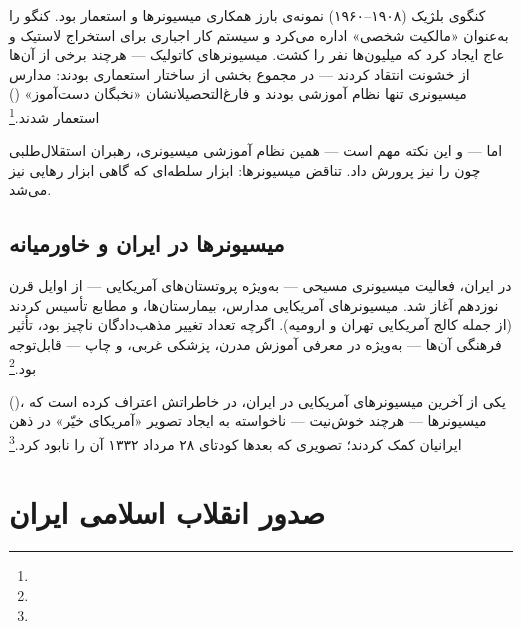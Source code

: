 \begin{tcolorbox}[casebox, title={مطالعه‌ی موردی: کنگوی بلژیک — میسیونرها و استعمار}]
کنگوی بلژیک (۱۹۰۸–۱۹۶۰) نمونه‌ی بارز همکاری میسیونرها و استعمار بود.  کنگو را به‌عنوان «مالکیت شخصی» اداره می‌کرد و سیستم کار اجباری برای استخراج لاستیک و عاج ایجاد کرد که میلیون‌ها نفر را کشت. میسیونرهای کاتولیک — هرچند برخی از آن‌ها از خشونت انتقاد کردند — در مجموع بخشی از ساختار استعماری بودند: مدارس میسیونری تنها نظام آموزشی بودند و فارغ‌التحصیلانشان «نخبگان دست‌آموز» () استعمار شدند.\footnote{}

اما — و این نکته مهم است — همین نظام آموزشی میسیونری، رهبران استقلال‌طلبی چون  را نیز پرورش داد. تناقض میسیونرها: ابزار سلطه‌ای که گاهی ابزار رهایی نیز می‌شد.
\end{tcolorbox}

\subsection{میسیونرها در ایران و خاورمیانه}
\label{subsec:ch13-iran-missionaries}

در ایران، فعالیت میسیونری مسیحی — به‌ویژه پروتستان‌های آمریکایی — از اوایل قرن نوزدهم آغاز شد. میسیونرهای آمریکایی مدارس، بیمارستان‌ها، و مطابع تأسیس کردند (از جمله کالج آمریکایی تهران و ارومیه). اگرچه تعداد تغییر مذهب‌دادگان ناچیز بود، تأثیر فرهنگی آن‌ها — به‌ویژه در معرفی آموزش مدرن، پزشکی غربی، و چاپ — قابل‌توجه بود.\footnote{}

 ()، یکی از آخرین میسیونرهای آمریکایی در ایران، در خاطراتش اعتراف کرده است که میسیونرها — هرچند خوش‌نیت — ناخواسته به ایجاد تصویر «آمریکای خیّر» در ذهن ایرانیان کمک کردند؛ تصویری که بعدها کودتای ۲۸ مرداد ۱۳۳۲ آن را نابود کرد.\footnote{}


\section{صدور انقلاب اسلامی ایران}
\label{sec:ch13-iran-revolution-export}

